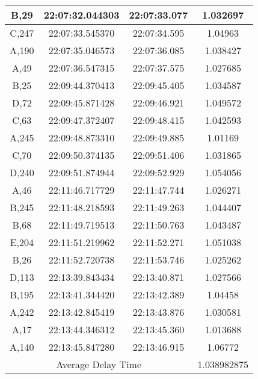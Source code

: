\begin{longtable}{|ccc|c|}
    \multicolumn{1}{|c|}{B,29}  & \multicolumn{1}{c|}{22:07:32.044303} & 22:07:33.077       & 1.032697    \\ \hline
    \multicolumn{1}{|c|}{C,247} & \multicolumn{1}{c|}{22:07:33.545370} & 22:07:34.595       & 1.04963     \\ \hline
    \multicolumn{1}{|c|}{A,190} & \multicolumn{1}{c|}{22:07:35.046573} & 22:07:36.085       & 1.038427    \\ \hline
    \multicolumn{1}{|c|}{A,49}  & \multicolumn{1}{c|}{22:07:36.547315} & 22:07:37.575       & 1.027685    \\ \hline
    \multicolumn{1}{|c|}{B,25}  & \multicolumn{1}{c|}{22:09:44.370413} & 22:09:45.405       & 1.034587    \\ \hline
    \multicolumn{1}{|c|}{D,72}  & \multicolumn{1}{c|}{22:09:45.871428} & 22:09:46.921       & 1.049572    \\ \hline
    \multicolumn{1}{|c|}{C,63}  & \multicolumn{1}{c|}{22:09:47.372407} & 22:09:48.415       & 1.042593    \\ \hline
    \multicolumn{1}{|c|}{A,245} & \multicolumn{1}{c|}{22:09:48.873310} & 22:09:49.885       & 1.01169     \\ \hline
    \multicolumn{1}{|c|}{C,70}  & \multicolumn{1}{c|}{22:09:50.374135} & 22:09:51.406       & 1.031865    \\ \hline
    \multicolumn{1}{|c|}{D,240} & \multicolumn{1}{c|}{22:09:51.874944} & 22:09:52.929       & 1.054056    \\ \hline
    \multicolumn{1}{|c|}{A,46}  & \multicolumn{1}{c|}{22:11:46.717729} & 22:11:47.744       & 1.026271    \\ \hline
    \multicolumn{1}{|c|}{B,245} & \multicolumn{1}{c|}{22:11:48.218593} & 22:11:49.263       & 1.044407    \\ \hline
    \multicolumn{1}{|c|}{B,68}  & \multicolumn{1}{c|}{22:11:49.719513} & 22:11:50.763       & 1.043487    \\ \hline
    \multicolumn{1}{|c|}{E,204} & \multicolumn{1}{c|}{22:11:51.219962} & 22:11:52.271       & 1.051038    \\ \hline
    \multicolumn{1}{|c|}{B,26}  & \multicolumn{1}{c|}{22:11:52.720738} & 22:11:53.746       & 1.025262    \\ \hline
    \multicolumn{1}{|c|}{D,113} & \multicolumn{1}{c|}{22:13:39.843434} & 22:13:40.871       & 1.027566    \\ \hline
    \multicolumn{1}{|c|}{B,195} & \multicolumn{1}{c|}{22:13:41.344420} & 22:13:42.389       & 1.04458     \\ \hline
    \multicolumn{1}{|c|}{A,242} & \multicolumn{1}{c|}{22:13:42.845419} & 22:13:43.876       & 1.030581    \\ \hline
    \multicolumn{1}{|c|}{A,17}  & \multicolumn{1}{c|}{22:13:44.346312} & 22:13:45.360       & 1.013688    \\ \hline
    \multicolumn{1}{|c|}{A,140} & \multicolumn{1}{c|}{22:13:45.847280} & 22:13:46.915       & 1.06772     \\ \hline
    \multicolumn{3}{|c|}{Average Delay Time}                                                & 1.038982875 \\ \hline
\end{longtable}

